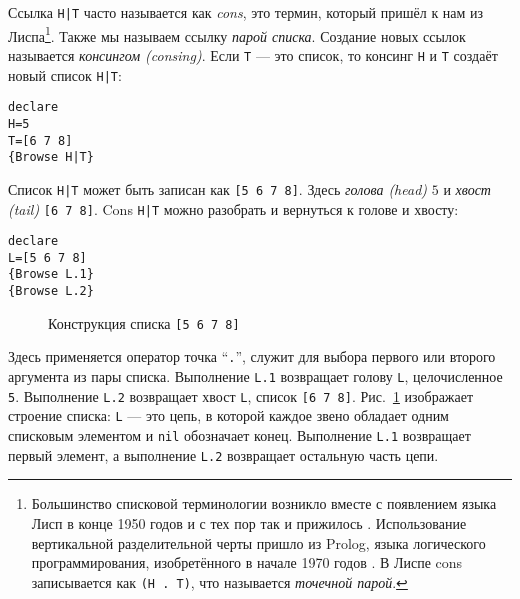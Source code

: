 Ссылка \lstinline!H|T! часто называется как \emph{cons}, это термин, который пришёл к нам из Лиспа\footnote{Большинство списковой терминологии возникло вместе с появлением языка Лисп в конце 1950 годов и с тех пор так и прижилось \cite{120}. Использование вертикальной разделительной черты пришло из Prolog, языка логического программирования, изобретённого в начале 1970 годов \cite{40, 182}. В Лиспе cons записывается как \lstinline|(H . T)|, что называется \emph{точечной парой}.}. Также мы называем ссылку \emph{парой списка}. Создание новых ссылок называется \emph{консингом (consing)}. Если \lstinline|T| --- это список, то консинг \lstinline|H| и \lstinline|T| создаёт новый список \lstinline!H|T!:



\begin{lstlisting}
declare
H=5
T=[6 7 8]
{Browse H|T}
\end{lstlisting}

Список \lstinline!H|T! может быть записан как \lstinline|[5 6 7 8]|. Здесь \emph{голова (head)} $5$ и \emph{хвост (tail)} \lstinline|[6 7 8]|. Cons \lstinline!H|T! можно разобрать и вернуться к голове и хвосту:

\begin{lstlisting}
declare
L=[5 6 7 8]
{Browse L.1}
{Browse L.2}
\end{lstlisting}

\begin{figure}[h]
  \caption{Конструкция списка \lstinline|[5 6 7 8]|}
  \label{figure:list_construction}
\end{figure}

Здесь применяется оператор точка ``\lstinline|.|'', служит для выбора первого или второго аргумента из пары списка. Выполнение \lstinline|L.1| возвращает голову \lstinline|L|, целочисленное \lstinline|5|. Выполнение \lstinline|L.2| возвращает хвост \lstinline|L|, список \lstinline|[6 7 8]|. Рис.~\ref{figure:list_construction} изображает строение списка: \lstinline|L| --- это цепь, в которой каждое звено обладает одним списковым элементом и \lstinline|nil| обозначает конец. Выполнение \lstinline|L.1| возвращает первый элемент, а выполнение \lstinline|L.2| возвращает остальную часть цепи.

